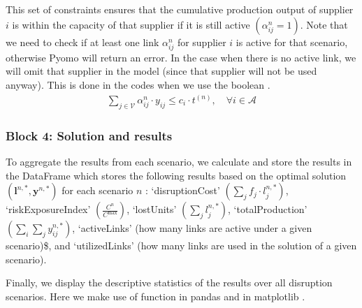 \documentclass[letterpaper,10pt,english]{jupyterBook}
\begin{document}
\sphinxAtStartPar
This set of constraints ensures that the cumulative production output of supplier \(i\) is within the capacity of that supplier if it is still active \(\left(\alpha^{n}_{ij}=1\right)\). Note that we need to check if at least one link \(\alpha^{n}_{ij}\) for supplier \(i\) is active for that scenario, otherwise Pyomo will return an error. In the case when there is no active link, we will omit that supplier in the model (since that supplier will not be used anyway). This is done in the codes when we use the boolean .
\begin{equation*}
\begin{split}\sum_{j\in\mathcal{V}} \alpha^{n}_{ij} \cdot y_{ij}  \leq c_i \cdot t^{(n)},\quad \forall i\in \mathcal{A} \end{split}
\end{equation*}

\subsubsection{Block 4: Solution and results}
\label{\detokenize{docs/Case3_1_Disruption_Risk_Analytics:block-4-solution-and-results}}
\sphinxAtStartPar
To aggregate the results from each scenario, we calculate and store the results in the  DataFrame which stores the following results based on the optimal solution \(\left( \mathbf{l}^{n,*}, \mathbf{y}^{n,*} \right)\) for each scenario \(n\) : ‘disruptionCost’ \(\left( \sum_j f_j \cdot l_j^{n,*} \right)\), ‘riskExposureIndex’ \(\left( \frac{C^n}{C^{\max}} \right)\), ‘lostUnits’ \(\left( \sum_j l_j^{n,*} \right)\), ‘totalProduction’ \(\left( \sum_i \sum_j y_{ij}^{n,*} \right)\), ‘activeLinks’ (how many links are active under a given scenario)\$, and ‘utilizedLinks’ (how many links are used in the solution of a given scenario).

\sphinxAtStartPar
Finally, we display the descriptive statistics of the results over all disruption scenarios. Here we make use of function  in pandas  and  in matplotlib .
\end{document}

